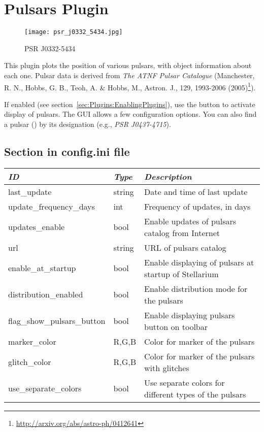 \newpage

\section{Pulsars Plugin}
\label{sec:plugins:Pulsars}

\begin{figure}[ht]
\texttt{[image: psr\_j0332\_5434.jpg]}
\label{fig:plugin:Pulsars}
\caption{PSR J0332-5434}
\end{figure}

\noindent This plugin plots the position of various pulsars, with object
information about each one. Pulsar data is derived from \textit{The
  ATNF Pulsar Catalogue} (Manchester, R. N., Hobbs, G. B., Teoh, A. \&
Hobbs, M., Astron. J., 129, 1993-2006
(2005)\footnote{\url{http://arxiv.org/abs/astro-ph/0412641}}).

If enabled (see section~\ref{sec:Plugins:EnablingPlugins}), use the
 button to activate display of
pulsars. The GUI allows a few configuration options.  You can also
find a pulsar () by its designation (e.g., \emph{PSR
  J0437-4715}).



\subsection{Section  in config.ini file}
\label{sec:plugins:Pulsars:config}

\begin{longtabu} to \textwidth {l|l|X}\toprule
\emph{ID}               & \emph{Type} & \emph{Description}\\\midrule
last\_update                & string & Date and time of last update\\\midrule
update\_frequency\_days     & int    & Frequency of updates, in days\\\midrule
updates\_enable             & bool   & Enable updates of pulsars catalog from Internet \\\midrule
url                         & string & URL of pulsars catalog \\\midrule
enable\_at\_startup         & bool   & Enable displaying of pulsars at startup of Stellarium \\\midrule
distribution\_enabled       & bool   & Enable distribution mode for the pulsars \\\midrule
flag\_show\_pulsars\_button & bool   & Enable displaying pulsars button on toolbar \\\midrule
marker\_color               & R,G,B  & Color for marker of the pulsars \\\midrule
glitch\_color               & R,G,B  & Color for marker of the pulsars with glitches \\\midrule
use\_separate\_colors       & bool   & Use separate colors for different types of the pulsars \\\bottomrule
\end{longtabu}

